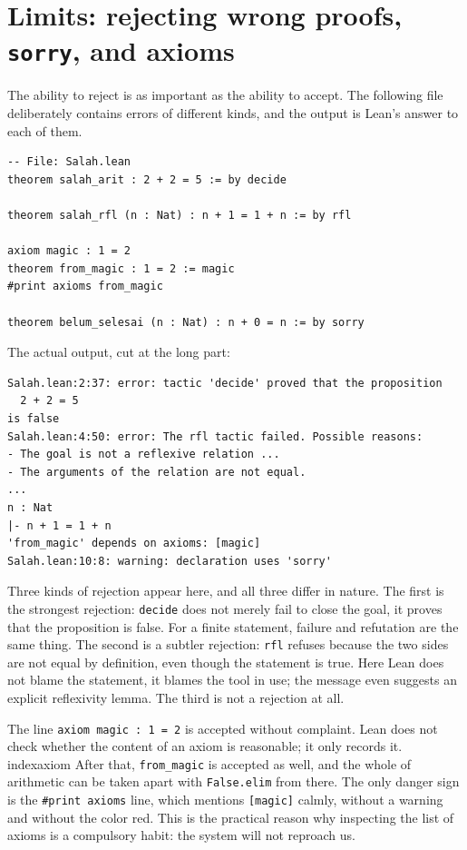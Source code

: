 \section{Limits: rejecting wrong proofs, \texttt{sorry}, and axioms}


The ability to reject is as important as the ability to accept. The following file deliberately
contains errors of different kinds, and the output is Lean's answer to each of them.

\begin{verbatim}
-- File: Salah.lean
theorem salah_arit : 2 + 2 = 5 := by decide

theorem salah_rfl (n : Nat) : n + 1 = 1 + n := by rfl

axiom magic : 1 = 2
theorem from_magic : 1 = 2 := magic
#print axioms from_magic

theorem belum_selesai (n : Nat) : n + 0 = n := by sorry
\end{verbatim}

The actual output, cut at the long part:

\begin{verbatim}
Salah.lean:2:37: error: tactic 'decide' proved that the proposition
  2 + 2 = 5
is false
Salah.lean:4:50: error: The rfl tactic failed. Possible reasons:
- The goal is not a reflexive relation ...
- The arguments of the relation are not equal.
...
n : Nat
|- n + 1 = 1 + n
'from_magic' depends on axioms: [magic]
Salah.lean:10:8: warning: declaration uses 'sorry'
\end{verbatim}

Three kinds of rejection appear here, and all three differ in nature. The first is the strongest
rejection: \texttt{decide} does not merely fail to close the goal, it proves that the proposition is
false. For a finite statement, failure and refutation are the same thing. The second is a subtler
rejection: \texttt{rfl} refuses because the two sides are not equal by definition, even though the
statement is true. Here Lean does not blame the statement, it blames the tool in use; the message
even suggests an explicit reflexivity lemma. The third is not a rejection at all.

The line \texttt{axiom magic : 1 = 2} is accepted without complaint. Lean does not check whether the
content of an axiom is reasonable; it only records it.\\index{axiom} After that,
\texttt{from\_magic} is accepted as well, and the whole of arithmetic can be taken apart with
\texttt{False.elim} from there. The only danger sign is the \texttt{\#print axioms} line, which
mentions \texttt{[magic]} calmly, without a warning and without the color red. This is the practical
reason why inspecting the list of axioms is a compulsory habit: the system will not reproach us.

